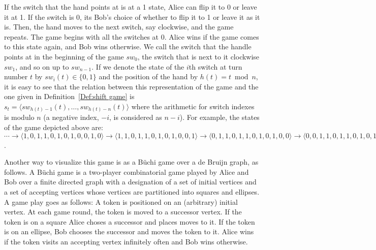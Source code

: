 \documentclass[final,12pt]{elsarticle}
\theoremstyle{definition} \newtheorem{definition}[theorem]{Definition} \newtheorem{observation}[theorem]{Observation} \newtheorem{example}[theorem]{Example} \newtheorem{remark}[theorem]{Remark} \newtheorem{corrolary}[theorem]{Corrolary}
\newcommand{\T}[1]{\langle{#1}\rangle} \DeclareMathOperator{\drop}{drop} \DeclareMathOperator{\dropbits}{drop\_bits} \DeclareMathOperator{\dropstates}{drop\_states} \DeclareMathOperator{\leadingForm}{LeadingForm} \DeclareMathOperator{\dv}{div} %
\begin{document}
If the switch that the hand points at is at a 1 state, Alice can flip it to 0 or leave it at 1. If the switch is 0, its Bob's choice of whether to flip it to 1 or leave it as it is. Then, the hand moves to the next switch, say clockwise, and the game repeats. The game begins with all the switches at 0. Alice wins if the game comes to this state again, and Bob wins otherwise. We call the switch that the handle points at in the beginning of the game $sw_0$, the switch that is next to it clockwise $sw_1$, and so on up to $sw_{n-1}$. If we denote the state of the $i$th switch at turn number $t$ by $sw_i(t) \in \{0,1\}$ and the position of the hand by $h(t) = t \bmod n$, it is easy to see that the relation between this representation of the game and the one given in Definition~\ref{Def:shift game} is $s_t=\langle sw_{h(t)-1}(t), \dots, sw_{h(t)-n}(t) \rangle$ where the arithmetic for switch indexes is modulo $n$ (a negative index, $-i$, is considered as $n-i$). For example, the states of the game depicted above are:
$\cdots \to \T{1,0,1,1,0,1,0,1,0,0,1,0} \to \T{1,1,0,1,1,0,1,0,1,0,0,1} \to \T{0,1,1,0,1,1,0,1,0,1,0,0} \to \T{0,0,1,1,0,1,1,0,1,0,1,0} \to \cdots$.

Another way to visualize this game is as a B\"uchi game over a de Bruijn graph, as follows. A B\"uchi game is a two-player combinatorial game played by Alice and Bob over a finite directed graph with a designation of a set of initial vertices and a set of accepting vertices whose vertices are partitioned into squares and ellipses. A game play goes as follows: A token is positioned on an (arbitrary) initial vertex. At each game round, the token is moved to a successor vertex. If the token is on a square Alice choses a successor and places moves to it. If the token is on an ellipse, Bob chooses the successor and moves the token to it. Alice wins if the token visits an accepting vertex infinitely often and Bob wins otherwise.
\end{document}
